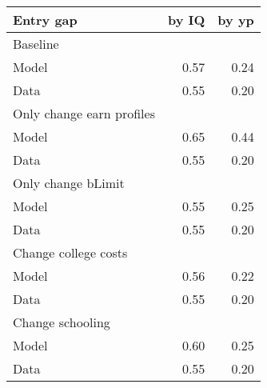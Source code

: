 \begin{tabular}{lrr}
\hline
Entry gap & by IQ  & by yp  \\
\hline
Baseline &   &   \\
Model & 0.57  & 0.24  \\
Data & 0.55  & 0.20  \\
Only change earn profiles &   &   \\
Model & 0.65  & 0.44  \\
Data & 0.55  & 0.20  \\
Only change bLimit &   &   \\
Model & 0.55  & 0.25  \\
Data & 0.55  & 0.20  \\
Change college costs &   &   \\
Model & 0.56  & 0.22  \\
Data & 0.55  & 0.20  \\
Change schooling &   &   \\
Model & 0.60  & 0.25  \\
Data & 0.55  & 0.20  \\
\hline
\end{tabular}%
